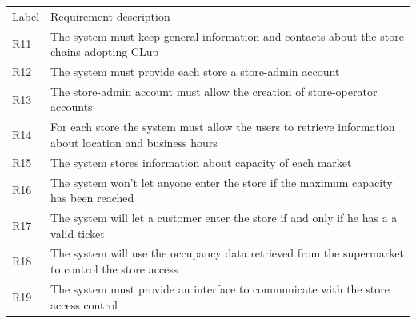 \renewcommand{\arraystretch}{1.4}
\begin{tabular}{C{1cm}L{14.1cm}}
    Label & Requirement description                                                                                                                                                                     \\

    R11   & The system must keep general information and contacts about the store chains adopting CLup                                                                                                  \\
    R12   & The system must provide each store a store-admin account                                                                                                                                    \\
    R13   & The store-admin account must allow the creation of store-operator accounts                                                                                                                  \\
    R14   & For each store the system must allow the users to retrieve information about location and business hours                                                                                    \\
    R15   & The system stores information about capacity of each market                                                                                                                                 \\
    R16   & The system won't let anyone enter the store if the maximum capacity has been reached                                                                                                        \\
    R17   & The system will let a customer enter the store if and only if he has a a valid ticket                                                                                                       \\
    R18   & The system will use the occupancy data retrieved from the supermarket to control the store access                                                                                           \\
    R19   & The system must provide an interface to communicate with the store access control                                                                                                           \\

\end{tabular}
